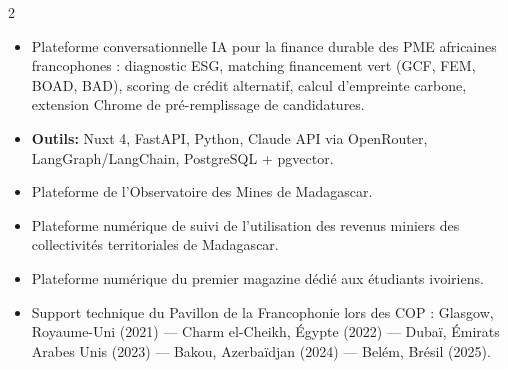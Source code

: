 \documentclass[10pt,a4paper,ragged2e,withhyper]{altacv}
\begin{document}
\begin{paracol}{2}
            \begin{itemize}
                \item Plateforme conversationnelle IA pour la finance durable des PME africaines francophones : diagnostic ESG, matching financement vert (GCF, FEM, BOAD, BAD), scoring de crédit alternatif, calcul d'empreinte carbone, extension Chrome de pré-remplissage de candidatures.
                \item \textcolor{SecondaryColor}{\textbf{Outils: }} Nuxt 4, FastAPI, Python, Claude API via OpenRouter, LangGraph/LangChain, PostgreSQL + pgvector.
            \end{itemize}
            \divider

            \begin{itemize}
                \item Plateforme de l'Observatoire des Mines de Madagascar.
            \end{itemize}
            \divider

            \begin{itemize}
                \item Plateforme numérique de suivi de l'utilisation des revenus miniers des collectivités territoriales de Madagascar.
            \end{itemize}
            \divider

            \begin{itemize}
                \item Plateforme numérique du premier magazine dédié aux étudiants ivoiriens.
            \end{itemize}


            \begin{itemize}
                \item Support technique du Pavillon de la Francophonie lors des COP : Glasgow, Royaume-Uni (2021) — Charm el-Cheikh, Égypte (2022) — Dubaï, Émirats Arabes Unis (2023) — Bakou, Azerbaïdjan (2024) — Belém, Brésil (2025).
            \end{itemize}
            \divider


\end{paracol}
\end{document}
